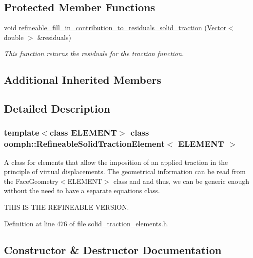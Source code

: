 \subsection*{Protected Member Functions}
\begin{DoxyCompactItemize}
\item 
void \hyperlink{classoomph_1_1RefineableSolidTractionElement_aa94332df93ad6d4aea402d35af4da121}{refineable\+\_\+fill\+\_\+in\+\_\+contribution\+\_\+to\+\_\+residuals\+\_\+solid\+\_\+traction} (\hyperlink{classoomph_1_1Vector}{Vector}$<$ double $>$ \&residuals)
\begin{DoxyCompactList}\small\item\em This function returns the residuals for the traction function. \end{DoxyCompactList}\end{DoxyCompactItemize}
\subsection*{Additional Inherited Members}


\subsection{Detailed Description}
\subsubsection*{template$<$class E\+L\+E\+M\+E\+NT$>$\newline
class oomph\+::\+Refineable\+Solid\+Traction\+Element$<$ E\+L\+E\+M\+E\+N\+T $>$}

A class for elements that allow the imposition of an applied traction in the principle of virtual displacements. The geometrical information can be read from the Face\+Geometry$<$\+E\+L\+E\+M\+E\+N\+T$>$ class and and thus, we can be generic enough without the need to have a separate equations class.

T\+H\+IS IS T\+HE R\+E\+F\+I\+N\+E\+A\+B\+LE V\+E\+R\+S\+I\+ON. 

Definition at line 476 of file solid\+\_\+traction\+\_\+elements.\+h.



\subsection{Constructor \& Destructor Documentation}
\mbox{\label{classoomph_1_1RefineableSolidTractionElement_a46b3cbd28e9a4eb8cc24e000250e3639}} 
